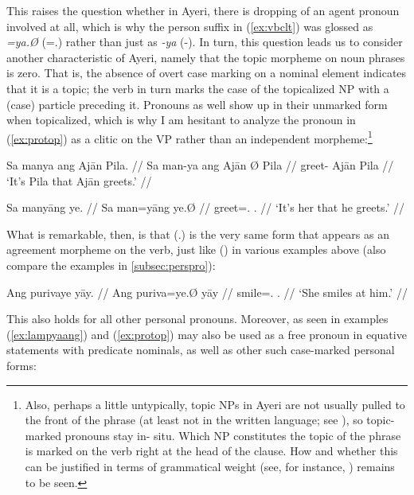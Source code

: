 This raises the question whether in Ayeri, there is dropping of an agent
pronoun involved at all, which is why the person suffix in (\ref{ex:vbclt}) was
glossed as \emph{=ya.Ø} (\mbox{=\TsgM{}.\Top{}}) rather than just as \emph{-ya}
(-\TsgM{}). In turn, this question leads us to consider another characteristic
of Ayeri, namely that the topic morpheme on noun phrases is zero. That is, the
absence of overt case marking on a nominal element indicates that it is a
topic; the verb in turn marks the case of the topicalized NP with a (case)
particle preceding it. Pronouns as well show up in their unmarked form when
topicalized, which is why I am hesitant to analyze the pronoun in
(\ref{ex:protop}) as a clitic on the VP rather than an independent
morpheme:\footnote{Also, perhaps a little untypically, topic NPs in Ayeri are
not usually pulled to the front of the phrase (at least not in the written
language; see \cite[120--122]{lehmann2015}), so topic-marked pronouns stay in-
situ. Which NP constitutes the topic of the phrase is marked on the verb right
at the head of the clause. How and whether this can be justified in terms of
grammatical weight (see, for instance, \cite[95--98]{wasow1997}) remains to be
seen.}

\pex %
\a\label{ex:fullsntc}\begingl
	\gla Sa manya ang Ajān {} Pila. //
	\glb Sa man-ya ang ​Ajān Ø ​Pila //
	\glc \PatT{} greet-\TsgM{} \Aarg{} ​Ajān \Top{} ​Pila //
	\glft `It's Pila that Ajān greets.' //
\endgl

\a\label{ex:protop}\begingl
	\gla Sa manyāng ye. //
	\glb Sa man=yāng ye.Ø //
	\glc \PatT{} greet=\TsgM{}.\Aarg{} \TsgF{}.\Top{} //
	\glft `It's her that he greets.' //
\endgl

\xe

What is remarkable, then, is that  (\TsgF{}.\Top{}) is the very 
same form that appears as an agreement morpheme on the verb, just like 
 (\TsgM{}) in various examples above (also compare the examples 
in \autoref{subsec:perspro}):

\ex %
\begingl
	\gla Ang purivaye yāy. //
	\glb Ang puriva=ye.Ø yāy //
	\glc \AgtT{} smile=\TsgF{}.\Top{} \TsgM{}.\Loc{} //
	\glft `She smiles at him.' //
\endgl\xe

This also holds for all other personal pronouns. Moreover, 
 as seen in examples (\ref{ex:lampyaang}) and 
(\ref{ex:protop}) may also be used as a free pronoun in equative statements 
with predicate nominals, as well as other such case-marked personal forms:

